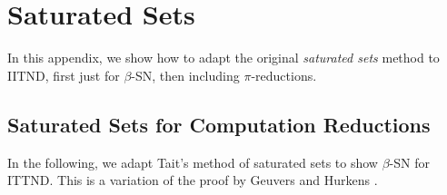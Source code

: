 \section{Saturated Sets}
\label{sec:sat}

In this appendix, we show how to adapt the original \emph{saturated
  sets} method to IITND, first just for $\beta$-SN, then including
$\pi$-reductions.

\subsection{Saturated Sets for Computation Reductions}
\label{sec:satbeta}

In the following, we adapt Tait's method of saturated sets to show $\beta$-SN
for ITTND.  This is a variation of the proof by Geuvers and Hurkens
\cite{geuversHurkens:types17}.


